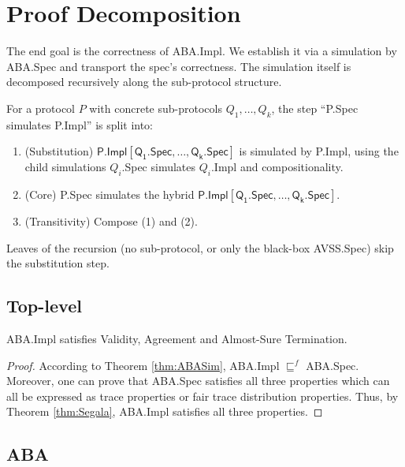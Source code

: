 \section{Proof Decomposition}

The end goal is the correctness of \textsf{ABA.Impl}.
We establish it via a simulation by \textsf{ABA.Spec} and transport the spec's correctness.
The simulation itself is decomposed recursively along the sub-protocol structure.

For a protocol $P$ with concrete sub-protocols $Q_1,\dots,Q_k$, the step ``\textsf{P.Spec}
simulates \textsf{P.Impl}'' is split into:
\begin{enumerate}
    \item (Substitution) $\mathsf{P.Impl}[\mathsf{Q_1.Spec},\dots,\mathsf{Q_k.Spec}]$ is simulated
    by \textsf{P.Impl}, using the child simulations \textsf{$Q_i$.Spec} simulates
    \textsf{$Q_i$.Impl} and compositionality.
    \item (Core) \textsf{P.Spec} simulates the hybrid
    $\mathsf{P.Impl}[\mathsf{Q_1.Spec},\dots,\mathsf{Q_k.Spec}]$.
    \item (Transitivity) Compose (1) and (2).
\end{enumerate}
Leaves of the recursion (no sub-protocol, or only the black-box \textsf{AVSS.Spec}) skip the
substitution step.

\subsection{Top-level}

\begin{theorem}\label{thm:ABACorrect}
    \textsf{ABA.Impl} satisfies Validity, Agreement and Almost-Sure Termination.
\end{theorem}
\begin{proof}
    According to Theorem \ref{thm:ABASim}, \textsf{ABA.Impl} $\sqsubseteq^f$
    \textsf{ABA.Spec}. Moreover, one can prove that \textsf{ABA.Spec} satisfies
    all three properties which can all be expressed as trace properties or fair trace
    distribution properties. Thus, by Theorem \ref{thm:Segala}, \textsf{ABA.Impl} satisfies all
    three properties.
\end{proof}

\subsection{ABA}

